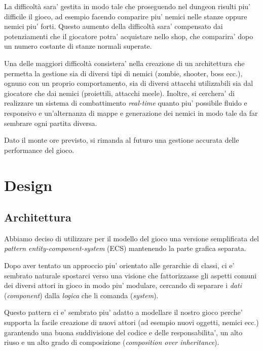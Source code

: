 \documentclass[a4paper,12pt]{report}
\begin{document}
La difficoltà sara' gestita in modo tale che proseguendo nel dungeon risulti piu' difficile il gioco, ad esempio facendo comparire piu' nemici nelle stanze oppure nemici piu' forti. Questo aumento della difficoltà sara' compensato dai potenziamenti che il giocatore potra' acquistare nello shop, che comparira' dopo un numero costante di stanze normali superate. 

Una delle maggiori difficoltà consistera' nella creazione di un architettura che permetta la gestione sia di diversi tipi di nemici (zombie, shooter, boss ecc.), ognuno con un proprio comportamento, sia di diversi attacchi utilizzabili sia dal giocatore che dai nemici (proiettili, attacchi meele). Inoltre, si cerchera' di realizzare un sistema di combattimento \textit{real-time} quanto piu' possibile fluido e responsivo e un'alternanza di mappe e generazione dei nemici in modo tale da far sembrare ogni partita diversa.

Dato il monte ore previsto, si rimanda al futuro una gestione accurata delle performance del gioco.




\chapter{Design}


\section{Architettura}
Abbiamo deciso di utilizzare per il modello del gioco una versione semplificata del \textit{pattern entity-component-system} (ECS) mantenendo la parte grafica separata.

Dopo aver tentato un approccio piu' orientato alle gerarchie di classi, ci e' sembrato naturale spostarci verso una visione che fattorizzasse gli aspetti comuni dei diversi attori in gioco in modo piu' modulare, cercando di separare i \textit{dati} (\textit{component}) dalla \textit{logica} che li comanda (\textit{system}).

Questo pattern ci e' sembrato piu' adatto a modellare il nostro gioco perche' supporta la facile creazione di nuovi attori (ad esempio nuovi oggetti, nemici ecc.) garantendo una buona suddivisione del codice e delle responsabilita', un alto riuso e un alto grado di composizione (\textit{composition over inheritance}). 
\end{document}
